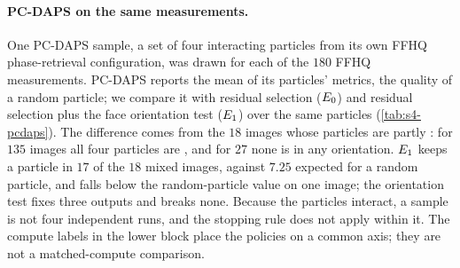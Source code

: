 \paragraph{PC-DAPS on the same measurements.}
One PC-DAPS sample, a set of four interacting particles from its own FFHQ phase-retrieval configuration, was drawn for each of the $180$ FFHQ measurements.
PC-DAPS reports the mean of its particles' metrics, the quality of a random particle; we compare it with residual selection ($E_0$) and residual selection plus the face orientation test ($E_1$) over the same particles (\cref{tab:s4-pcdaps}).
The difference comes from the $18$ images whose particles are partly \good: for $135$ images all four particles are \good, and for $27$ none is \good in any orientation.
$E_1$ keeps a \good particle in $17$ of the $18$ mixed images, against $7.25$ expected for a random particle, and falls below the random-particle value on one image; the orientation test fixes three outputs and breaks none.
Because the particles interact, a sample is not four independent runs, and the stopping rule does not apply within it.
The compute labels in the lower block place the policies on a common axis; they are not a matched-compute comparison.

\begin{table}[h]
\centering\small
\setlength{\tabcolsep}{4pt}
\caption{\textbf{PC-DAPS and DAPS-4K on the $180$ FFHQ measurements} (descriptive). Paired image-bootstrap intervals (20{,}000 replicates). Denoiser calls are nominal: DAPS-4K uses $400$ annealing steps with $10$ ODE steps each; a PC-DAPS sample uses $4\times(130+70\cdot5)$, and its logged count, which omits some pruning cost, averages $1{,}928$. Seconds: sampling only, batch 1, measured on one otherwise idle GPU on three images; $^*$linear extrapolation from the per-run time.}
\label{tab:s4-pcdaps}
\end{table}

